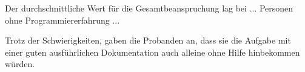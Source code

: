 Der durchschnittliche Wert für die Gesamtbeanspruchung lag bei ... Personen ohne Programmiererfahrung ...

 
Trotz der Schwierigkeiten,  gaben die Probanden an, dass sie die Aufgabe mit einer guten ausführlichen Dokumentation auch alleine ohne Hilfe hinbekommen würden.








































































